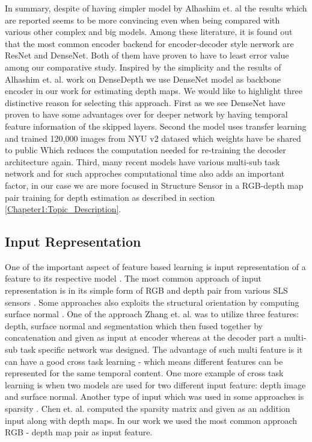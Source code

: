 In summary, despite of having simpler model by Alhashim et. al \cite{Alhashim2018}  the results which are reported seems to be more convincing even when being compared with various other complex and big models. Among these literature, it is found out that the most common encoder backend for encoder-decoder style nerwork are  ResNet and DenseNet. Both of them have proven to have to least error value among our comparative study. Inspired by the simplicity and the results of  Alhashim et. al. work on DenseDepth we use DenseNet model as backbone encoder in our work for estimating depth maps. We would like to highlight three distinctive reason for selecting this approach. First as we see DenseNet have proven to have some advantages over for deeper network by having temporal feature information of the skipped layers. Second the model uses transfer learning and trained 120,000 images from NYU v2 datased which weights have be shared to public Which reduces the computation needed for re-training the decoder architecture again. Third, many recent models have various multi-sub task network and for such approches computational time also adds an important factor, in our case we are more focused in Structure Sensor in a RGB-depth map pair training for depth estimation as described in section \ref{Chapeter1:Topic_Description}.


\subsection{Input Representation}
One of the important aspect of feature based learning is input representation of a feature to its respective model \cite{friedman2001elements}. The most common approach of input representation is in its simple form of RGB and depth pair from various SLS sensors \cite{eigen2014depth, xu2017multi}. Some approaches also exploits the structural orientation by computing surface normal \cite{li2015depth, qi2018geonet}. One of the approach Zhang et. al. \cite{Zhang_2019_CVPR} was to utilize three features:  depth, surface normal and segmentation which then fused together by concatenation and given as input at encoder whereas at the decoder part a multi-sub task specific network was designed. The advantage of such multi feature is it can have a good cross task learning - which means different features can be represented for the same temporal content. One more example of  cross task learning is \cite{qi2018geonet} when two models are used for two different input feature: depth image and surface normal. Another type of input which was used in some approaches is sparsity  \cite{chen2018estimating, mal2018sparse}. Chen et. al. \cite{chen2018estimating} computed the sparsity matrix and given as an addition input along with depth maps. In our work we used the most common approach RGB - depth map pair as input feature.  

